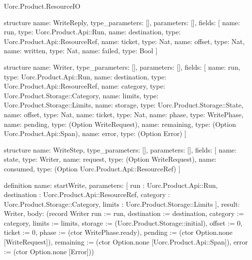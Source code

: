 \begin{lexlean}{Uorc.Product.ResourceIO}
\begin{semanticmodule}
structure{
  name: WriteReply,
  type_parameters: [],
  parameters: [],
  fields: [
    {name: run, type: Uorc.Product.Api::Run},
    {name: destination, type: Uorc.Product.Api::ResourceRef},
    {name: ticket, type: Nat},
    {name: offset, type: Nat},
    {name: written, type: Nat},
    {name: failed, type: Bool}
  ]
}

structure{
  name: Writer,
  type_parameters: [],
  parameters: [],
  fields: [
    {name: run, type: Uorc.Product.Api::Run},
    {name: destination, type: Uorc.Product.Api::ResourceRef},
    {name: category, type: Uorc.Product.Storage::Category},
    {name: limits, type: Uorc.Product.Storage::Limits},
    {name: storage, type: Uorc.Product.Storage::State},
    {name: offset, type: Nat},
    {name: ticket, type: Nat},
    {name: phase, type: WritePhase},
    {name: pending, type: (Option WriteRequest)},
    {name: remaining, type: (Option Uorc.Product.Api::Span)},
    {name: error, type: (Option Error)}
  ]
}

structure{
  name: WriteStep,
  type_parameters: [],
  parameters: [],
  fields: [
    {name: state, type: Writer},
    {name: request, type: (Option WriteRequest)},
    {name: consumed, type: (Option Uorc.Product.Api::ResourceRef)}
  ]
}

definition{
  name: startWrite,
  parameters: [
    run : Uorc.Product.Api::Run,
    destination : Uorc.Product.Api::ResourceRef,
    category : Uorc.Product.Storage::Category,
    limits : Uorc.Product.Storage::Limits
  ],
  result: Writer,
  body: (record Writer {run := run, destination := destination, category := category, limits := limits, storage := (Uorc.Product.Storage::initial), offset := 0, ticket := 0, phase := (ctor WritePhase.ready), pending := (ctor Option.none [WriteRequest]), remaining := (ctor Option.none [Uorc.Product.Api::Span]), error := (ctor Option.none [Error])})
}


\end{semanticmodule}
\end{lexlean}
